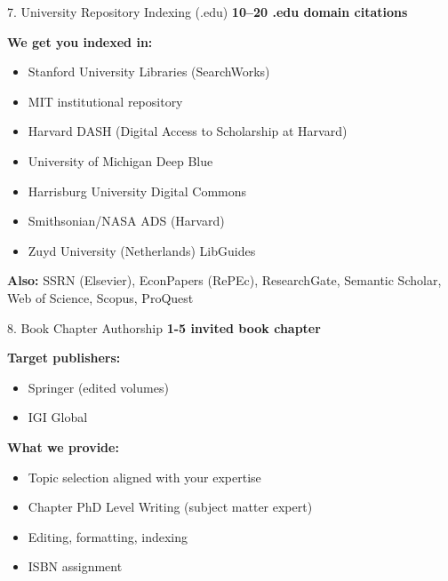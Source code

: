 \documentclass[aspectratio=169, 10pt]{beamer}
\begin{document}
	\begin{frame}{7. University Repository Indexing (.edu)}
		\faUniversity \hspace{0.2cm} \textbf{10–20 .edu domain citations}
		
		\textbf{We get you indexed in:}
		\begin{itemize}
			\item Stanford University Libraries (SearchWorks)
			\item MIT institutional repository
			\item Harvard DASH (Digital Access to Scholarship at Harvard)
			\item University of Michigan Deep Blue
			\item Harrisburg University Digital Commons
			\item Smithsonian/NASA ADS (Harvard)
			\item Zuyd University (Netherlands) LibGuides
		\end{itemize}
		
		\textbf{Also:} SSRN (Elsevier), EconPapers (RePEc), ResearchGate, Semantic Scholar, Web of Science, Scopus, ProQuest
	\end{frame}
	
	\begin{frame}{8. Book Chapter Authorship}
		\faBook \hspace{0.2cm} \textbf{1-5 invited book chapter}
		
		\textbf{Target publishers:}
		\begin{itemize}
			\item Springer (edited volumes)
			\item IGI Global
		\end{itemize}
		
		\textbf{What we provide:}
		\begin{itemize}
			\item Topic selection aligned with your expertise
			\item Chapter PhD Level Writing (subject matter expert)
			\item Editing, formatting, indexing
			\item ISBN assignment
		\end{itemize}
	\end{frame}
	
\end{document}
